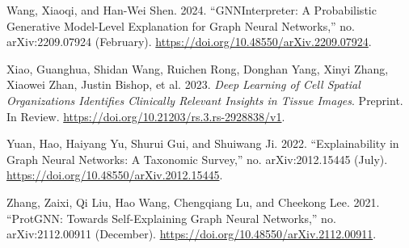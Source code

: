 \documentclass[
  11pt,
  letterpaper,
]{article}
\newlength{\cslhangindent}
\newlength{\cslentryspacingunit} %
\newenvironment{CSLReferences}[2] %
 {%
  \setlength{\parindent}{0pt}
  \ifodd #1
  \let\oldpar\par
  \def\par{\hangindent=\cslhangindent\oldpar}
  \fi
  \setlength{\parskip}{#2\cslentryspacingunit}
 }%
 {}
\begin{document}
\begin{CSLReferences}{1}{0}
\leavevmode{}%
Wang, Xiaoqi, and Han-Wei Shen. 2024. {``GNNInterpreter: A Probabilistic
Generative Model-Level Explanation for Graph Neural Networks,''} no.
arXiv:2209.07924 (February).
\url{https://doi.org/10.48550/arXiv.2209.07924}.

\leavevmode{}%
Xiao, Guanghua, Shidan Wang, Ruichen Rong, Donghan Yang, Xinyi Zhang,
Xiaowei Zhan, Justin Bishop, et al. 2023. \emph{Deep Learning of Cell
Spatial Organizations Identifies Clinically Relevant Insights in Tissue
Images}. Preprint. In Review.
\url{https://doi.org/10.21203/rs.3.rs-2928838/v1}.

\leavevmode{}%
Yuan, Hao, Haiyang Yu, Shurui Gui, and Shuiwang Ji. 2022.
{``Explainability in Graph Neural Networks: A Taxonomic Survey,''} no.
arXiv:2012.15445 (July).
\url{https://doi.org/10.48550/arXiv.2012.15445}.

\leavevmode{}%
Zhang, Zaixi, Qi Liu, Hao Wang, Chengqiang Lu, and Cheekong Lee. 2021.
{``ProtGNN: Towards Self-Explaining Graph Neural Networks,''} no.
arXiv:2112.00911 (December).
\url{https://doi.org/10.48550/arXiv.2112.00911}.

\end{CSLReferences}
\end{document}
